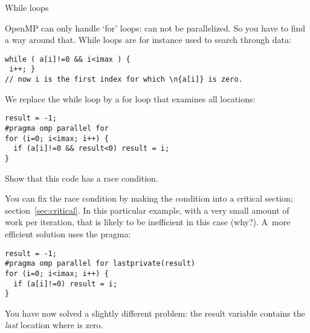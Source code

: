  {While loops}

OpenMP can only handle `for' loops:  can not
be parallelized. So you have to find a way around that. While loops
are for instance used to search through data:
\begin{lstlisting}
while ( a[i]!=0 && i<imax ) {
 i++; }
// now i is the first index for which \n{a[i]} is zero.
\end{lstlisting}
We replace the while loop by a for loop that examines all locations:
\begin{lstlisting}
result = -1;
#pragma omp parallel for
for (i=0; i<imax; i++) {
  if (a[i]!=0 && result<0) result = i;
}
\end{lstlisting}
\begin{exercise}
  Show that this code has a race condition.
\end{exercise}
You can fix the race condition by making the condition into a critical section;
section~\ref{sec:critical}. In this particular example, with a very small amount
of work per iteration, that is likely to be inefficient 
in this case (why?).
A~more efficient solution uses the  pragma:
\begin{lstlisting}
result = -1;
#pragma omp parallel for lastprivate(result)
for (i=0; i<imax; i++) {
  if (a[i]!=0) result = i;
}
\end{lstlisting}
You have now solved a slightly different problem: the result variable
contains the \emph{last} location where  is zero.

